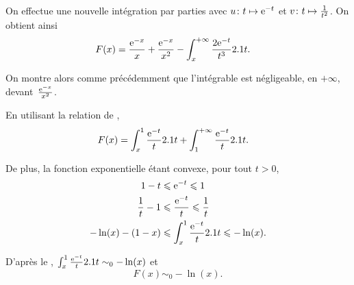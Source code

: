 \begin{elemsolution}
\begin{reponses}
\item On effectue une nouvelle intégration par parties avec $\fonctionligne[u]{t}{\e^{-t}}$ et $\fonctionligne[v]{t}{\frac{1}{t^2}}$. On obtient ainsi
\begin{align*}
F(x)
&= \frac{\e^{-x}}{x} + \frac{\e^{-x}}{x^2} - \int_x^{+\infty} \frac{2 \e^{-t}}{t^3} \d t.
\end{align*}

On montre alors comme précédemment que l'intégrable est négligeable, en $+\infty$, devant~$\frac{\e^{-x}}{x^2}$.

\item En utilisant la relation de ,
\begin{align*}
F(x)
&= \int_x^1 \frac{\e^{-t}}{t} \d t + \int_1^{+\infty} \frac{\e^{-t}}{t} \d t.
\end{align*}

De plus, la fonction exponentielle étant convexe, pour tout $t > 0$,
\begin{align*}
1 - t &\leqslant \e^{-t} \leqslant 1\\
\frac{1}{t} - 1 &\leqslant \frac{\e^{-t}}{t} \leqslant \frac{1}{t}\\
-\ln(x) - (1 - x) &\leqslant \int_x^1 \frac{\e^{-t}}{t} \d t \leqslant -\ln(x).
\end{align*}

D'après le , $\int_x^1 \frac{\e^{-t}}{t} \d t \sim_0 -\ln(x)$ et
\[
F(x) \sim_0 -\ln(x).
\]
\end{reponses}
\end{elemsolution}